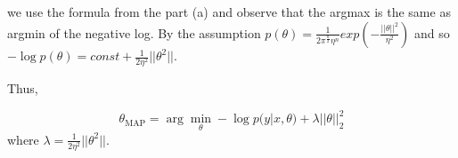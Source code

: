 \begin{answer}
we use the formula from the part (a) and observe that the argmax is the same as argmin of the negative log.
By the assumption
$p(\theta) = \frac 1{2\pi^{\frac n2}\eta^n}exp(-\frac{||\theta||^2}{\eta^2})$
and so
$-\log p(\theta) = const + \frac 1{2\eta^2}||\theta^2||.$

Thus,

$$\theta_{\text{MAP}} = \arg\min_\theta - \log p(y|x,\theta) + \lambda||\theta||^2_2$$
where
$\lambda = \frac 1{2\eta^2}||\theta^2||.$
\end{answer}
